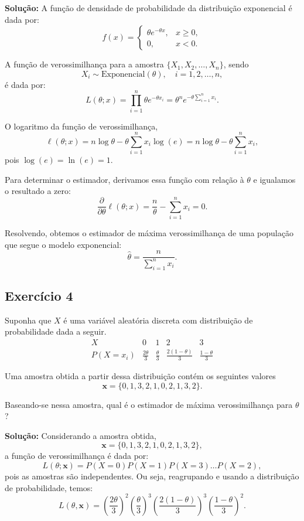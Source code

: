 \documentclass{article}
\begin{document}
\vspace{0.5cm}
\textbf{Solução:} 
A função de densidade de probabilidade da distribuição exponencial é dada por:
    $$
    f(x) = 
    \begin{cases}
    \theta e^{-\theta x}, & x \geq 0,\\
    0, & x < 0.
    \end{cases}
    $$
    
A função de verossimilhança para a amostra $\{X_1, X_2, \ldots, X_n\}$, sendo
    $$
    X_i \sim \text{Exponencial}(\theta), \quad i=1,2,\ldots,n,
    $$    
é dada por:
    $$
    L(\theta; x) = \prod_{i=1}^n \theta e^{-\theta x_i} 
    = \theta^n e^{-\theta \sum_{i=1}^n x_i}.
    $$

O logaritmo da função de verossimilhança,
    $$
    \ell(\theta; x) 
    = n \log \theta - \theta \sum_{i=1}^n x_i \log(e)
    = n \log \theta - \theta \sum_{i=1}^n x_i,
    $$
pois $\log(e) = \ln(e) = 1$.

Para determinar o estimador, derivamos essa função com relação à $\theta$ e igualamos o resultado a zero:
    $$
    \frac{\partial}{\partial \theta} \ell(\theta; x) 
    = \frac{n}{\theta} - \sum_{i=1}^n x_i = 0.
    $$
    
Resolvendo, obtemos o estimador de máxima verossimilhança de uma população que segue o modelo exponencial:
    $$
    \hat{\theta} 
    = \frac{n}{\sum_{i=1}^n x_i}.
    $$
    
\subsection{Exercício 4}
Suponha que $X$ é uma variável aleatória discreta com distribuição de probabilidade dada a seguir.
    \[
    \begin{array}{c|cccc}
    X & 0 & 1 & 2 & 3 \\ \hline
    P(X = x_i) & \frac{2\theta}{3} & \frac{\theta}{3} & \frac{2(1-\theta)}{3} & \frac{1-\theta}{3}
    \end{array}
    \]

Uma amostra obtida a partir dessa distribuição contém os seguintes valores 
    $$
    \mathbf{x} = \{0, 1, 3, 2, 1, 0, 2, 1, 3, 2\}.
    $$

Baseando-se nessa amostra, qual é o estimador de máxima verossimilhança para $\theta$?

\vspace{0.5cm}
\textbf{Solução:} 
Considerando a amostra obtida, 
    $$
    \mathbf{x} = \{0, 1, 3, 2, 1, 0, 2, 1, 3, 2\},
    $$
a função de verossimilhança é dada por:
    $$
    L(\theta; \mathbf{x}) = P(X = 0) P(X = 1) P(X = 3) \dots P(X = 2),
    $$
pois as amostras são independentes. Ou seja, reagrupando e usando a distribuição de probabilidade, temos:
    $$
    L(\theta, \mathbf{x}) = 
    \left(\frac{2\theta}{3}\right)^2 
    \left(\frac{\theta}{3}\right)^3 
    \left(\frac{2(1-\theta)}{3}\right)^3
    \left(\frac{1-\theta}{3}\right)^2.
    $$
\end{document}

